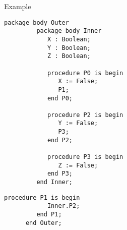 \documentclass[xcolor={dvipsnames}]{beamer}
\begin{document}
\begin{frame}[fragile]{Example}
  \begin{multicols}{2}
    \begin{lstlisting}[gobble=6]
      package body Outer
         package body Inner
            X : Boolean;
            Y : Boolean;
            Z : Boolean;

            procedure P0 is begin
               X := False;
               P1;
            end P0;

            procedure P2 is begin
               Y := False;
               P3;
            end P2;

            procedure P3 is begin
               Z := False;
            end P3;
         end Inner;
    \end{lstlisting}
    \vfill\columnbreak
    \begin{lstlisting}[gobble=6]
         procedure P1 is begin
            Inner.P2;
         end P1;
      end Outer;
    \end{lstlisting}
  \end{multicols}
\end{frame}
\end{document}

